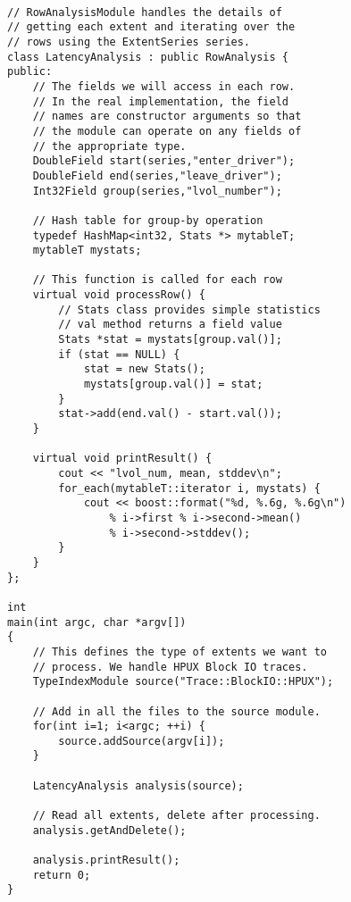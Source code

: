 { \footnotesize
\begin{verbatim}

// RowAnalysisModule handles the details of 
// getting each extent and iterating over the 
// rows using the ExtentSeries series.
class LatencyAnalysis : public RowAnalysis {
public:
    // The fields we will access in each row. 
    // In the real implementation, the field 
    // names are constructor arguments so that 
    // the module can operate on any fields of
    // the appropriate type.
    DoubleField start(series,"enter_driver");
    DoubleField end(series,"leave_driver");
    Int32Field group(series,"lvol_number");

    // Hash table for group-by operation
    typedef HashMap<int32, Stats *> mytableT;
    mytableT mystats;

    // This function is called for each row
    virtual void processRow() {
        // Stats class provides simple statistics
        // val method returns a field value
        Stats *stat = mystats[group.val()];
        if (stat == NULL) {
            stat = new Stats();
            mystats[group.val()] = stat;
        }
        stat->add(end.val() - start.val());
    }

    virtual void printResult() {
        cout << "lvol_num, mean, stddev\n";
        for_each(mytableT::iterator i, mystats) {
            cout << boost::format("%d, %.6g, %.6g\n") 
                % i->first % i->second->mean() 
                % i->second->stddev();
        }
    }
};

int
main(int argc, char *argv[]) 
{
    // This defines the type of extents we want to 
    // process. We handle HPUX Block IO traces.
    TypeIndexModule source("Trace::BlockIO::HPUX");

    // Add in all the files to the source module.
    for(int i=1; i<argc; ++i) {
        source.addSource(argv[i]);
    }

    LatencyAnalysis analysis(source);

    // Read all extents, delete after processing.
    analysis.getAndDelete();
    
    analysis.printResult();
    return 0;
}

\end{verbatim}
}

